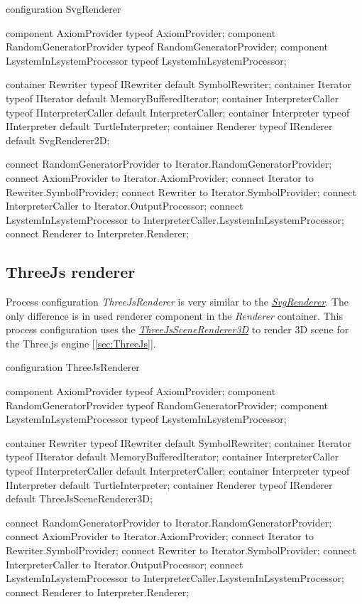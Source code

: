 \begin{LsystemBreak}
configuration SvgRenderer {
	component AxiomProvider typeof AxiomProvider;
	component RandomGeneratorProvider typeof RandomGeneratorProvider;
	component LsystemInLsystemProcessor typeof LsystemInLsystemProcessor;

	container Rewriter typeof IRewriter default SymbolRewriter;
	container Iterator typeof IIterator default MemoryBufferedIterator;
	container InterpreterCaller typeof IInterpreterCaller default InterpreterCaller;
	container Interpreter typeof IInterpreter default TurtleInterpreter;
	container Renderer typeof IRenderer default SvgRenderer2D;

	connect RandomGeneratorProvider to Iterator.RandomGeneratorProvider;
	connect AxiomProvider to Iterator.AxiomProvider;
	connect Iterator to Rewriter.SymbolProvider;
	connect Rewriter to Iterator.SymbolProvider;
	connect InterpreterCaller to Iterator.OutputProcessor;
	connect LsystemInLsystemProcessor to InterpreterCaller.LsystemInLsystemProcessor;
	connect Renderer to Interpreter.Renderer;
}
\end{LsystemBreak}


\subsection{ThreeJs renderer}
\label{configurationThreeJsRenderer}

Process configuration \emph{ThreeJsRenderer} is very similar to the \hyperref[configurationSvgRenderer]{\emph{SvgRenderer}}.
The only difference is in used renderer component in the \emph{Renderer} container.
This process configuration uses the \hyperref[Malsys.Processing.Components.Renderers.ThreeJsSceneRenderer3D]{\emph{ThreeJsSceneRenderer3D}} to render 3D scene for the Three.js engine [\ref{sec:ThreeJs}].

\begin{LsystemBreak}
configuration ThreeJsRenderer {
	component AxiomProvider typeof AxiomProvider;
	component RandomGeneratorProvider typeof RandomGeneratorProvider;
	component LsystemInLsystemProcessor typeof LsystemInLsystemProcessor;

	container Rewriter typeof IRewriter default SymbolRewriter;
	container Iterator typeof IIterator default MemoryBufferedIterator;
	container InterpreterCaller typeof IInterpreterCaller default InterpreterCaller;
	container Interpreter typeof IInterpreter default TurtleInterpreter;
	container Renderer typeof IRenderer default ThreeJsSceneRenderer3D;

	connect RandomGeneratorProvider to Iterator.RandomGeneratorProvider;
	connect AxiomProvider to Iterator.AxiomProvider;
	connect Iterator to Rewriter.SymbolProvider;
	connect Rewriter to Iterator.SymbolProvider;
	connect InterpreterCaller to Iterator.OutputProcessor;
	connect LsystemInLsystemProcessor to InterpreterCaller.LsystemInLsystemProcessor;
	connect Renderer to Interpreter.Renderer;
}
\end{LsystemBreak}


